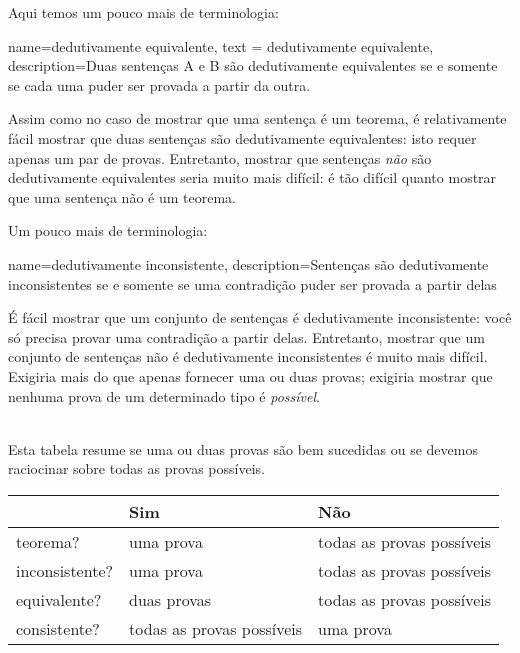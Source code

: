 Aqui temos um pouco mais de terminologia:
        
{
  name=dedutivamente equivalente,
  text = dedutivamente equivalente,
description={Duas senten\c cas A e B s\~ao  dedutivamente equivalentes  se e somente se cada  uma puder ser provada a partir da outra.}
}


Assim como no caso de mostrar que uma senten\c ca \'e um teorema, \'e relativamente f\'acil mostrar que duas senten\c cas s\~ao dedutivamente equivalentes: isto requer apenas um par de provas. Entretanto, mostrar que senten\c cas \emph{n\~ao} s\~ao dedutivamente equivalentes seria muito mais dif\'icil: \'e t\~ao dif\'icil quanto mostrar que uma senten\c ca n\~ao \'e um teorema.

Um pouco mais de terminologia:
        
{    name={dedutivamente inconsistente}, 
  description={Senten\c cas  s\~ao dedutivamente inconsistentes  se e somente se uma  contradi\c c\~ao puder ser provada a partir delas}
}

        \'E f\'acil mostrar que um conjunto de senten\c cas \'e dedutivamente inconsistente: voc\^e s\'o precisa provar uma contradi\c c\~ao a partir delas.  Entretanto,  mostrar que um conjunto de senten\c cas n\~ao \'e dedutivamente inconsistentes \'e muito mais dif\'icil. Exigiria mais do que apenas fornecer uma ou duas provas; exigiria mostrar que nenhuma prova de um determinado tipo \'e \emph{poss\'ivel}.

\
\\
Esta tabela resume se uma ou duas provas s\~ao bem sucedidas ou se devemos raciocinar sobre todas as provas poss\'iveis.

\begin{center}
\begin{tabular}{l l l}
 & \textbf{Sim} & \textbf{ N\~ao}\\
 \hline
teorema? & uma prova & todas as provas poss\'iveis\\
inconsistente? &  uma prova  & todas as provas poss\'iveis\\
equivalente? & duas provas & todas as provas poss\'iveis\\
consistente? & todas as provas poss\'iveis & uma prova\\
\end{tabular}
\end{center}

